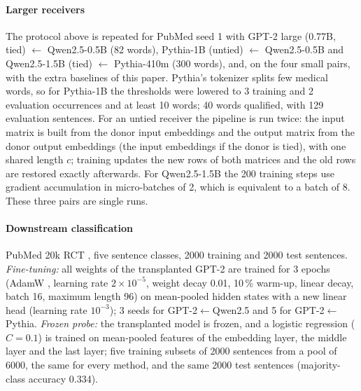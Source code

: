 \documentclass[preprint,12pt]{elsarticle}
\begin{document}
\paragraph{Larger receivers}\label{par:large} The protocol above is repeated for PubMed seed 1 with GPT-2 large (0.77B, tied) $\leftarrow$ Qwen2.5-0.5B (82 words), Pythia-1B (untied) $\leftarrow$ Qwen2.5-0.5B and Qwen2.5-1.5B (tied) $\leftarrow$ Pythia-410m (300 words), and, on the four small pairs, with the extra baselines of this paper. Pythia's tokenizer splits few medical words, so for Pythia-1B the thresholds were lowered to 3 training and 2 evaluation occurrences and at least 10 words; 40 words qualified, with 129 evaluation sentences. For an untied receiver the pipeline is run twice: the input matrix is built from the donor input embeddings and the output matrix from the donor output embeddings (the input embeddings if the donor is tied), with one shared length $c$; training updates the new rows of both matrices and the old rows are restored exactly afterwards. For Qwen2.5-1.5B the 200 training steps use gradient accumulation in micro-batches of 2, which is equivalent to a batch of 8. These three pairs are single runs.

\paragraph{Downstream classification} PubMed 20k RCT \cite{dernoncourt2017pubmedrct}, five sentence classes, 2000 training and 2000 test sentences. \emph{Fine-tuning:} all weights of the transplanted GPT-2 are trained for 3 epochs (AdamW \cite{loshchilov2019adamw}, learning rate $2\times10^{-5}$, weight decay 0.01, 10\,\% warm-up, linear decay, batch 16, maximum length 96) on mean-pooled hidden states with a new linear head (learning rate $10^{-3}$); 3 seeds for GPT-2$\leftarrow$Qwen2.5 and 5 for GPT-2$\leftarrow$Pythia. \emph{Frozen probe:} the transplanted model is frozen, and a logistic regression ($C=0.1$) is trained on mean-pooled features of the embedding layer, the middle layer and the last layer; five training subsets of 2000 sentences from a pool of 6000, the same for every method, and the same 2000 test sentences (majority-class accuracy 0.334).
\end{document}

